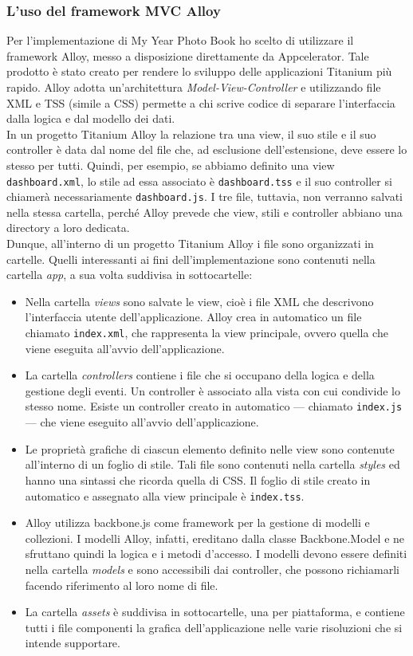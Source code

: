 			\subsubsection{L'uso del framework MVC Alloy}
				Per l'implementazione di My Year Photo Book ho scelto di utilizzare il framework Alloy, messo a disposizione
				direttamente da Appcelerator. Tale prodotto è stato creato per rendere lo sviluppo delle applicazioni Titanium più
				rapido. Alloy adotta un’architettura \emph{Model-View-Controller} e utilizzando file XML e TSS (simile a CSS)
				permette a chi scrive codice di separare l'interfaccia dalla logica e dal modello dei dati.\\
				In un progetto Titanium Alloy la relazione tra una view, il suo stile e il suo controller è data dal nome del file
				che, ad esclusione dell'estensione, deve essere lo stesso per tutti. Quindi, per esempio, se abbiamo definito una
				view \texttt{dashboard.xml}, lo stile ad essa associato è \texttt{dashboard.tss} e il suo controller si chiamerà
				necessariamente \texttt{dashboard.js}. I tre file, tuttavia, non verranno salvati nella stessa cartella, perché
				Alloy prevede che view, stili e controller abbiano una directory a loro dedicata.\\
				Dunque, all'interno di un progetto Titanium Alloy i file sono organizzati in cartelle. Quelli interessanti ai fini
				dell'implementazione sono contenuti nella cartella \emph{app}, a sua volta suddivisa in sottocartelle:
				\begin{itemize}
					\item Nella cartella \emph{views} sono salvate le view, cioè i file XML che descrivono l'interfaccia utente
					dell'applicazione. Alloy crea in automatico un file chiamato \texttt{index.xml}, che rappresenta la view
					principale, ovvero quella che viene eseguita all'avvio dell'applicazione.
					\item La cartella \emph{controllers} contiene i file che si occupano della logica e della gestione degli
					eventi. Un controller è associato alla vista con cui condivide lo stesso nome. Esiste un controller
					creato in automatico — chiamato \texttt{index.js} — che viene eseguito all'avvio dell'applicazione.
					\item Le proprietà grafiche di ciascun elemento definito nelle view sono contenute all'interno di un foglio
					di stile. Tali file sono contenuti nella cartella \emph{styles} ed hanno una sintassi che ricorda quella di
					CSS. Il foglio di stile creato in automatico e assegnato alla view principale è \texttt{index.tss}.
					\item Alloy utilizza backbone.js come framework per la gestione di modelli e collezioni. I modelli
					Alloy, infatti, ereditano dalla classe Backbone.Model e ne sfruttano quindi la logica e i metodi d'accesso.
					I modelli devono essere definiti nella cartella \emph{models} e sono accessibili dai controller, che possono
					richiamarli facendo riferimento al loro nome di file.
					\item La cartella \emph{assets} è suddivisa in sottocartelle, una per piattaforma, e contiene
					tutti i file componenti la grafica dell'applicazione nelle varie risoluzioni che si intende supportare.
				\end{itemize}
